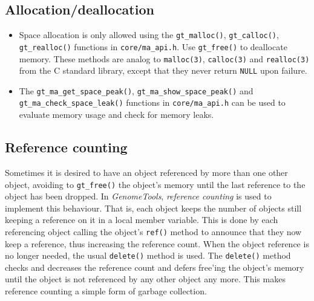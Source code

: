 \documentclass[11pt,final]{article}
\newcommand{\keyword}[1]{\lstinline{#1}}
\newcommand{\Gt}[0]{\emph{GenomeTools}\xspace}
\begin{document}
\subsection{Allocation/deallocation}
\begin{itemize}
\item
Space allocation is only allowed using the \keyword{gt_malloc()},
\keyword{gt_calloc()}, \keyword{gt_realloc()} functions in
\keyword{core/ma_api.h}. Use \keyword{gt_free()} to deallocate memory.
These methods are analog to \keyword{malloc(3)}, \keyword{calloc(3)} and
\keyword{realloc(3)} from the C standard library, except that they never return
\keyword{NULL} upon failure.
\item
The \keyword{gt_ma_get_space_peak()}, \keyword{gt_ma_show_space_peak()} and
\keyword{gt_ma_check_space_leak()} functions in \keyword{core/ma_api.h} can be
used to evaluate memory usage and check for memory leaks.
\end{itemize}

\subsection{Reference counting}
Sometimes it is desired to have an object referenced by more than one other
object, avoiding to \keyword{gt_free()} the object's memory until the last
reference to the object has been dropped. In \Gt, \emph{reference counting} is
used to implement this behaviour. That is, each object keeps the number of
objects still keeping a reference on it in a local member variable. This is done
by each referencing object calling the object's \keyword{ref()} method to
announce that they now keep a reference, thus increasing the reference count.
When the object reference is no longer needed, the usual \keyword{delete()}
method is used. The \keyword{delete()} method checks and decreases the
reference count and defers free'ing the object's memory until the object is not
referenced by any other object any more. This makes reference counting a simple
form of garbage collection.
\end{document}

